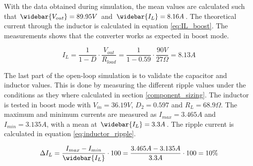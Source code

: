 With the data obtained during simulation, the mean values are calculated such that $\widebar{V_{out}} = 89.95V$ and $\widebar{I_L} = 8.16A$. The theoretical current through the inductor is calculated in equation \ref{eq:IL_boost}. The measurements shows that the converter works as expected in boost mode.

\vspace{-0.6cm}
\begin{equation} \label{eq:IL_boost}
	I_L = \frac{1}{1-D} \cdot \frac{V_{out}}{R_{load}} = \frac{1}{1-0.59} \cdot \frac{90V}{27\Omega} = 8.13A
\end{equation}

The last part of the open-loop simulation is to validate the capacitor and inductor values. This is done by measuring the different ripple values under the conditions as they where calculated in section \ref{component_sizing}. The inductor is tested in boost mode with $V_{in} = 36.19V$, $D_{2} = 0.597$ and $R_{L} = 68.9\Omega$. The maximum and minimum currents are measured as $I_{max} = 3.465A$ and $I_{min} = 3.135A$, with a mean at $\widebar{I_L} = 3.3A$. The ripple current is calculated in equation \ref{eq:inductor_ripple}.

\begin{equation} \label{eq:inductor_ripple}
	\Delta I_L = \frac{I_{max}-I_{min}}{\widebar{I_L}} \cdot 100 = \frac{3.465A-3.135A}{3.3A} \cdot 100 = 10\%
\end{equation}

